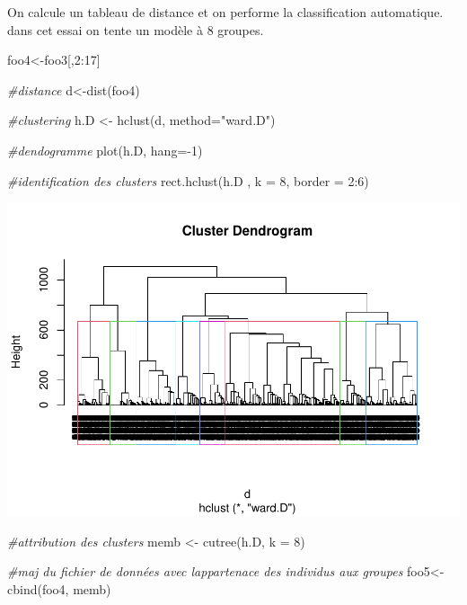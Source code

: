 \documentclass[
]{book}
\newenvironment{Shaded}{\begin{snugshade}}{\end{snugshade}}
\newcommand{\AttributeTok}[1]{\textcolor[rgb]{0.77,0.63,0.00}{#1}}
\newcommand{\CommentTok}[1]{\textcolor[rgb]{0.56,0.35,0.01}{\textit{#1}}}
\newcommand{\DecValTok}[1]{\textcolor[rgb]{0.00,0.00,0.81}{#1}}
\newcommand{\FunctionTok}[1]{\textcolor[rgb]{0.00,0.00,0.00}{#1}}
\newcommand{\NormalTok}[1]{#1}
\newcommand{\OtherTok}[1]{\textcolor[rgb]{0.56,0.35,0.01}{#1}}
\newcommand{\SpecialCharTok}[1]{\textcolor[rgb]{0.00,0.00,0.00}{#1}}
\newcommand{\StringTok}[1]{\textcolor[rgb]{0.31,0.60,0.02}{#1}}
\begin{document}
On calcule un tableau de distance et on performe la classification automatique. dans cet essai on tente un modèle à 8 groupes.

\begin{Shaded}
\begin{Highlighting}[]
\NormalTok{foo4}\OtherTok{\textless{}{-}}\NormalTok{foo3[,}\DecValTok{2}\SpecialCharTok{:}\DecValTok{17}\NormalTok{]}

\CommentTok{\#distance}
\NormalTok{d}\OtherTok{\textless{}{-}}\FunctionTok{dist}\NormalTok{(foo4)}

\CommentTok{\#clustering}
\NormalTok{h.D  }\OtherTok{\textless{}{-}} \FunctionTok{hclust}\NormalTok{(d, }\AttributeTok{method=}\StringTok{"ward.D"}\NormalTok{)}

\CommentTok{\#dendogramme}
\FunctionTok{plot}\NormalTok{(h.D,  }\AttributeTok{hang=}\SpecialCharTok{{-}}\DecValTok{1}\NormalTok{)}

\CommentTok{\#identification des clusters}
\FunctionTok{rect.hclust}\NormalTok{(h.D , }\AttributeTok{k =} \DecValTok{8}\NormalTok{, }\AttributeTok{border =} \DecValTok{2}\SpecialCharTok{:}\DecValTok{6}\NormalTok{)}
\end{Highlighting}
\end{Shaded}

\includegraphics{bookdown-demo_files/figure-latex/0814-1.pdf}

\begin{Shaded}
\begin{Highlighting}[]
\CommentTok{\#attribution des clusters}
\NormalTok{memb }\OtherTok{\textless{}{-}} \FunctionTok{cutree}\NormalTok{(h.D, }\AttributeTok{k =} \DecValTok{8}\NormalTok{)}

\CommentTok{\#maj du fichier de données avec l\textquotesingle{}appartenace des individus aux groupes}
\NormalTok{foo5}\OtherTok{\textless{}{-}}\FunctionTok{cbind}\NormalTok{(foo4, memb)}
\end{Highlighting}
\end{Shaded}
\end{document}
